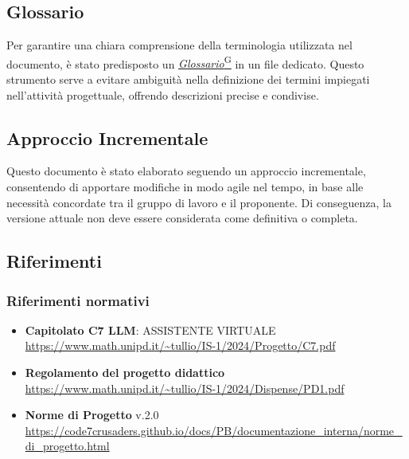 \subsection{Glossario}
Per garantire una chiara comprensione della terminologia utilizzata nel documento,
è stato predisposto un \href{https://code7crusaders.github.io/docs/PB/documentazione_interna/glossario.html#glossario}{\emph{Glossario}\textsuperscript{G}} in un file dedicato. Questo strumento 
serve a evitare ambiguità nella definizione dei termini impiegati nell’attività progettuale, 
offrendo descrizioni precise e condivise. 

\subsection{Approccio Incrementale}
Questo documento è stato elaborato seguendo un approccio incrementale, 
consentendo di apportare modifiche in modo agile nel tempo, 
in base alle necessità concordate tra il gruppo di lavoro e il proponente. Di conseguenza, 
la versione attuale non deve essere considerata come definitiva o completa.

\subsection{Riferimenti}
\subsubsection{Riferimenti normativi}
\begin{itemize}
    \item \textbf{Capitolato C7 LLM}: ASSISTENTE VIRTUALE \\ \url{https://www.math.unipd.it/~tullio/IS-1/2024/Progetto/C7.pdf}
    \item \textbf{Regolamento del progetto didattico} \\ \url{https://www.math.unipd.it/~tullio/IS-1/2024/Dispense/PD1.pdf}
    \item \textbf{Norme di Progetto} v.2.0 \\ \url{https://code7crusaders.github.io/docs/PB/documentazione_interna/norme_di_progetto.html}
\end{itemize}

